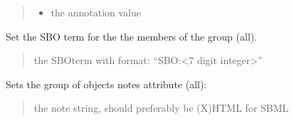\documentclass[letterpaper,12pt,english]{sphinxmanual}
\begin{document}
\begin{fulllineitems}
\begin{fulllineitems}
\begin{quote}
\begin{description}
\begin{itemize}
\item {} 
\sphinxAtStartPar
{} \textendash{} the annotation value

\end{itemize}

\end{description}\end{quote}

\end{fulllineitems}


\begin{fulllineitems}
\label{\detokenize{api/core:cbmpy.CBModel.Group.setSharedSBOterm}}
\pysigstartsignatures
\pysiglinewithargsret
{}
{}
{}
\pysigstopsignatures
\sphinxAtStartPar
Set the SBO term for the the members of the group (all).
\begin{quote}\begin{description}
\sphinxAtStartPar
{} \textendash{} the SBOterm with format: “SBO:\textless{}7 digit integer\textgreater{}”

\end{description}\end{quote}

\end{fulllineitems}


\begin{fulllineitems}
\label{\detokenize{api/core:cbmpy.CBModel.Group.setSharedNotes}}
\pysigstartsignatures
\pysiglinewithargsret
{}
{}
{}
\pysigstopsignatures
\sphinxAtStartPar
Sets the group of objects notes attribute (all):
\begin{quote}\begin{description}
\sphinxAtStartPar
{} \textendash{} the note string, should preferably be (X)HTML for SBML

\end{description}\end{quote}


\end{fulllineitems}
\end{fulllineitems}
\end{document}
